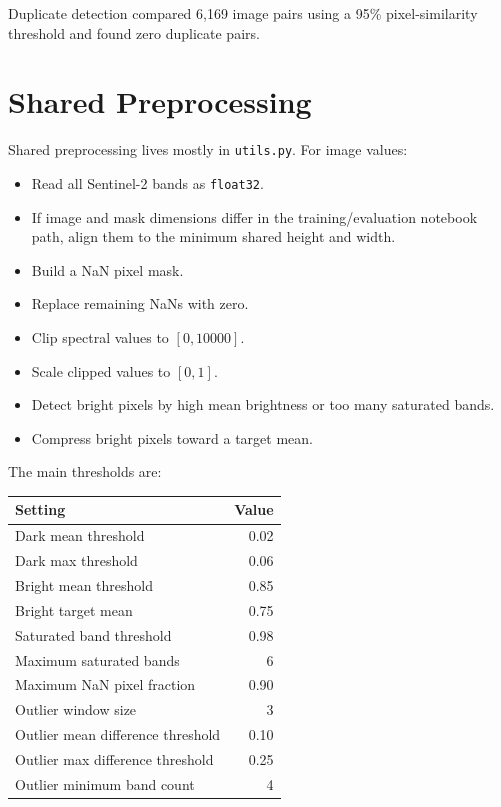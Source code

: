 \documentclass[11pt,a4paper]{article}
\begin{document}
Duplicate detection compared 6,169 image pairs using a 95\% pixel-similarity threshold and found zero duplicate pairs.

\section{Shared Preprocessing}

Shared preprocessing lives mostly in \texttt{utils.py}. For image values:
\begin{itemize}[noitemsep]
  \item Read all Sentinel-2 bands as \texttt{float32}.
  \item If image and mask dimensions differ in the training/evaluation notebook path, align them to the minimum shared height and width.
  \item Build a NaN pixel mask.
  \item Replace remaining NaNs with zero.
  \item Clip spectral values to $[0, 10000]$.
  \item Scale clipped values to $[0, 1]$.
  \item Detect bright pixels by high mean brightness or too many saturated bands.
  \item Compress bright pixels toward a target mean.
\end{itemize}

The main thresholds are:
\begin{center}
\begin{tabular}{lr}
\toprule
Setting & Value \\
\midrule
Dark mean threshold & 0.02 \\
Dark max threshold & 0.06 \\
Bright mean threshold & 0.85 \\
Bright target mean & 0.75 \\
Saturated band threshold & 0.98 \\
Maximum saturated bands & 6 \\
Maximum NaN pixel fraction & 0.90 \\
Outlier window size & 3 \\
Outlier mean difference threshold & 0.10 \\
Outlier max difference threshold & 0.25 \\
Outlier minimum band count & 4 \\
\bottomrule
\end{tabular}
\end{center}
\end{document}
